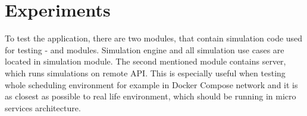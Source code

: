 \chapter{Experiments}\label{ch:experiments}

To test the application,
there are two modules, 
that contain simulation code used for testing -
 and  modules.
Simulation engine and all simulation use cases are located in simulation module.
The second mentioned module contains server, 
which runs simulations on remote API. 
This is especially useful when testing whole scheduling environment for example in Docker Compose network
and it is as closest as possible to real life environment,
which should be running in micro services architecture.



